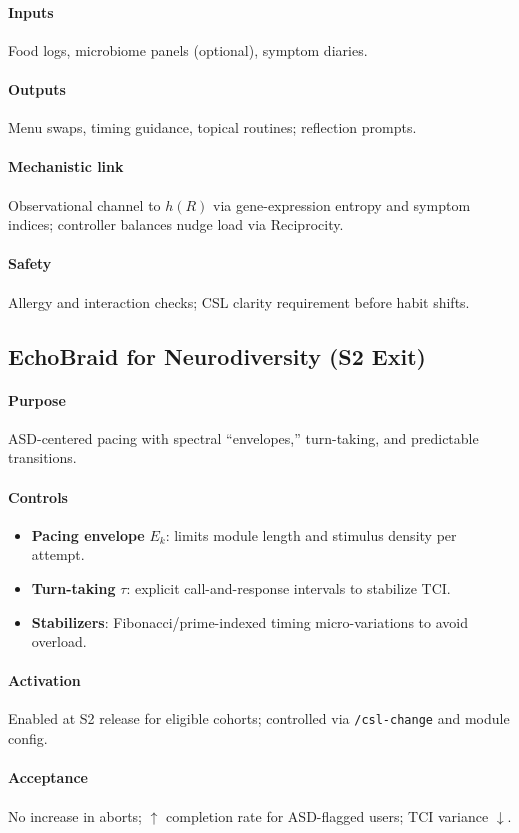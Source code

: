 \documentclass[11pt]{article}
\theoremstyle{plain}
\begin{document}
\paragraph{Inputs} Food logs, microbiome panels (optional), symptom diaries.
\paragraph{Outputs} Menu swaps, timing guidance, topical routines; reflection prompts.
\paragraph{Mechanistic link} Observational channel to $h(R)$ via gene-expression entropy and symptom indices; controller balances nudge load via Reciprocity.
\paragraph{Safety} Allergy and interaction checks; CSL clarity requirement before habit shifts.

\subsection{EchoBraid for Neurodiversity (S2 Exit)}
\paragraph{Purpose} ASD-centered pacing with spectral ``envelopes,'' turn-taking, and predictable transitions.
\paragraph{Controls}
\begin{itemize}
  \item \textbf{Pacing envelope} $E_k$: limits module length and stimulus density per attempt.
  \item \textbf{Turn-taking} $\tau$: explicit call-and-response intervals to stabilize TCI.
  \item \textbf{Stabilizers}: Fibonacci/prime-indexed timing micro-variations to avoid overload.
\end{itemize}
\paragraph{Activation} Enabled at S2 release for eligible cohorts; controlled via \texttt{/csl-change} and module config.
\paragraph{Acceptance} No increase in aborts; $\uparrow$ completion rate for ASD-flagged users; TCI variance $\downarrow$.
\end{document}
